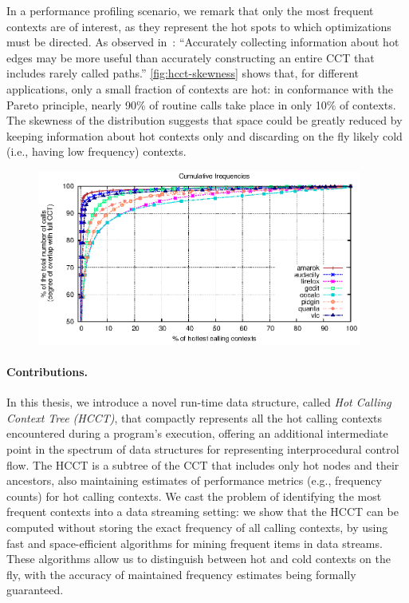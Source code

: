 In a performance profiling scenario, we remark that only the most frequent contexts are of interest, as they represent the hot spots to which optimizations must be directed. As observed in~\cite{Zhuang06}: ``Accurately collecting information about hot edges may be more useful than accurately constructing an entire CCT that includes rarely called paths.'' \myfigure\ref{fig:hcct-skewness} shows that, for different applications, only a small fraction of contexts are hot: in conformance with the Pareto principle, nearly 90\% of routine calls take place in only 10\% of contexts. The skewness of the distribution suggests that space could be greatly reduced by keeping information about hot contexts only and discarding on the fly likely cold (i.e., having low frequency) contexts.

\ifdefined\noauthorea
\begin{figure}[hb]
\begin{center}
\includegraphics[width=0.95\textwidth]{figures/hcct-skewness/hcct-skewness.eps}
\caption{\protect}
\end{center}
\end{figure}
\fi

\paragraph*{Contributions.} In this thesis, we introduce a novel run-time data structure, called {\em Hot Calling Context Tree (HCCT)}, that compactly represents all the hot calling contexts encountered during a program's execution, offering an additional intermediate point in the spectrum of data structures for representing interprocedural control flow. The HCCT is a subtree of the CCT that includes only hot nodes and their ancestors, also maintaining estimates of performance metrics (e.g., frequency counts) for hot calling contexts. We cast the problem of identifying the most frequent contexts into a data streaming setting: we show that the HCCT can be computed without storing the exact frequency of all calling contexts, by using fast and space-efficient algorithms for mining frequent items in data streams. These algorithms allow us to distinguish between hot and cold contexts on the fly, with the accuracy of maintained frequency estimates being formally guaranteed.


